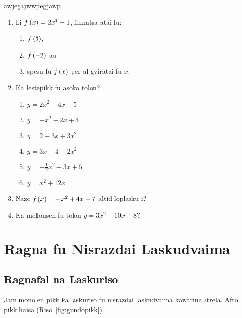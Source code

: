 \begin{exercise}
	awjegajwwpegjawp \\
	\begin{enumerate}
		\item Li \(f\left(x\right) = 2x^2 + 1\), finnatsa atai fu:
		      \begin{enumerate}
			      \item \(f\left(3\right)\),
			      \item \(f\left(-2\right)\) au
			      \item spesu fu \(f\left(x\right)\) per al gviratai fu \(x\).
		      \end{enumerate}
		\item Ka lestepikk fu asoko tolon?
		      \begin{enumerate}
			      \item \(y = 2x^2 - 4x - 5\)
			      \item \(y = -x^2 - 2x + 3\)
			      \item \(y = 2 - 3x + 3x^2\)
			      \item \(y = 3x + 4 - 2x^2\)
			      \item \(y = -\frac{1}{2}x^2 - 3x + 5\)
			      \item \(y = x^2 + 12x\)
		      \end{enumerate}
		\item Naze \(f\left(x\right) = -x^2 + 4x - 7\) altid loplasku i?
		\item Ka mellonsen fu tolon \(y = 3x^2 - 10x - 8\)?
	\end{enumerate}
\end{exercise}

\section{Ragna fu Nisrazdai Laskudvaima}

\subsection{Ragnafal na Laskuriso}
Jam mono en pikk ka laskuriso fu nisrazdai laskudvaima
kawarina strela. Afto pikk haisa  (Riso~\ref{fig:gundopikk}).

